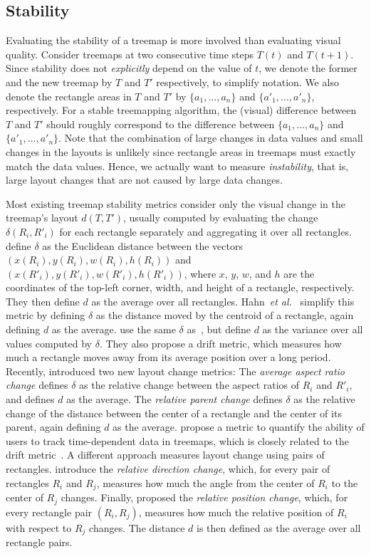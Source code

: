 \subsection{Stability}\label{sec:stablity}
%
Evaluating the stability of a treemap is more involved than evaluating visual quality. Consider treemaps at two consecutive time steps $T(t)$ and $T(t+1)$. Since stability does not \emph{explicitly} depend on the value of $t$, we denote the former and the new treemap by $T$ and $T'$ respectively, to simplify notation. We also denote the rectangle areas in $T$ and $T'$ by $\{a_1, \ldots, a_n\}$ and $\{a'_1, \ldots, a'_n\}$, respectively. For a stable treemapping algorithm, the (visual) difference between $T$ and $T'$ should roughly correspond to the difference between $\{a_1, \ldots, a_n\}$ and $\{a'_1, \ldots, a'_n\}$. Note that the combination of large changes in data values and small changes in the layouts is unlikely since rectangle areas in treemaps must exactly match the data values. Hence, we actually want to measure \emph{instability}, that is, large layout changes that are not caused by large data changes.

Most existing treemap stability metrics consider only the visual change in the treemap's layout $d(T, T')$, usually computed by evaluating the change $\delta(R_i, R'_i)$ for each rectangle separately and aggregating it over all rectangles. \cite{ordered} define $\delta$ as the Euclidean distance between the vectors $(x(R_i), y(R_i), w(R_i), h(R_i))$ and $(x(R'_i), y(R'_i), w(R'_i), h(R'_i))$, where $x$, $y$, $w$, and $h$ are the coordinates of the top-left corner, width, and height of a rectangle, respectively. They then define $d$ as the average over all rectangles. Hahn~\emph{et al.}~\citep{hahn10,hahn2015comparing} simplify this metric by defining $\delta$ as the distance moved by the centroid of a rectangle, again defining $d$ as the average. \cite{hilbert_moore} use the same $\delta$ as~\citep{ordered}, but define $d$ as the variance over all values computed by $\delta$. They also propose a drift metric, which measures how much a rectangle moves away from its average position over a long period. Recently, \cite{Scheibel2018} introduced two new layout change metrics: The \emph{average aspect ratio change} defines $\delta$ as the relative change between the aspect ratios of $R_i$ and $R'_i$, and defines $d$ as the average. The \emph{relative parent change} defines $\delta$ as the relative change of the distance between the center of a rectangle and the center of its parent, again defining $d$ as the average. \cite{Chen2017} propose a metric to quantify the ability of users to track time-dependent data in treemaps, which is closely related to the drift metric~\citep{hilbert_moore}. A different approach measures layout change using pairs of rectangles. \cite{Hahn2017} introduce the \emph{relative direction change}, which, for every pair of rectangles $R_i$ and $R_j$, measures how much the angle from the center of $R_i$ to the center of $R_j$ changes. Finally, \cite{sondag17} proposed the \emph{relative position change}, which, for every rectangle pair $(R_i, R_j)$, measures how much the relative position of $R_i$ with respect to $R_j$ changes. The distance $d$ is then defined as the average over all rectangle pairs. 


